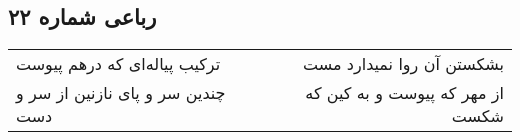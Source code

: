 \begin{center}
\section*{رباعی شماره ۲۲}
\label{sec:sh022}
\begin{longtable}{l p{0.5cm} r}
ترکیب پیاله‌ای که درهم پیوست
&&
بشکستن آن روا نمیدارد مست
\\
چندین سر و پای نازنین از سر و دست
&&
از مهر که پیوست و به کین که شکست
\\
\end{longtable}
\end{center}
